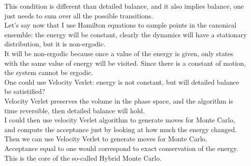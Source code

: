 This condition is different than detailed balance, and it also implies balance, one just needs to
sum over all the possible transitions.\\
Let's say now that I use Hamilton equations to sample points in the canonical ensemble: the energy will be constant, clearly the dynamics will have a stationary distribution, but it is non-ergodic.\\
It will be non-ergodic because once a value of the energy is given, only states with the same value of energy will be visited. Since there is a constant of motion, the system cannot be ergodic.\\
One could use Velocity Verlet: energy is not constant, but will detailed balance be satistified?\\
Velocity Verlet preserves the volume in the phase space, and the algorithm is time reversible, then  detailed balance will hold.\\
I could then use velocity Verlet algorithm to generate moves for Monte Carlo, and compute the acceptance just by looking at how much the energy changed. Then we can use Velocity Verlet to generate moves for Monte Carlo.\\
Acceptance equal to one would correspond to exact conservation of the energy.\\
This is the core of the so-called Hybrid Monte Carlo.